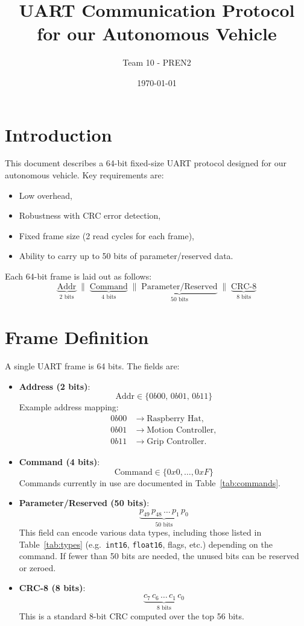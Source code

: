 \documentclass[a4paper,11pt]{article}
\begin{document}
\title{UART Communication Protocol for our Autonomous Vehicle}
\author{Team 10 - PREN2}
\date{\today}
\maketitle

\section{Introduction}
This document describes a 64-bit fixed-size UART protocol designed for our autonomous vehicle. Key requirements are:
\begin{itemize}
  \item Low overhead,
  \item Robustness with CRC error detection,
  \item Fixed frame size (2 read cycles for each frame),
  \item Ability to carry up to 50 bits of parameter/reserved data.
\end{itemize}

\bigskip
Each 64-bit frame is laid out as follows:
\[
\underbrace{\text{Addr}}_{2 \text{ bits}}
\;\|\;
\underbrace{\text{Command}}_{4 \text{ bits}}
\;\|\;
\underbrace{\text{Parameter/Reserved}}_{50 \text{ bits}}
\;\|\;
\underbrace{\text{CRC-8}}_{8 \text{ bits}}
\]

\section{Frame Definition}
A single UART frame is 64 bits. The fields are:

\begin{itemize}
  \item \textbf{Address (2 bits)}:
    \[
      \text{Addr} \in \{0b00,\, 0b01,\, 0b11\}
    \]
    Example address mapping:
    \begin{align*}
      0b00 &\rightarrow \text{Raspberry Hat},\\
      0b01 &\rightarrow \text{Motion Controller},\\
      0b11 &\rightarrow \text{Grip Controller}.
    \end{align*}

  \item \textbf{Command (4 bits)}:
    \[
      \text{Command} \in \{ 0x0,\dots,0xF \}
    \]
    Commands currently in use are documented in Table~\ref{tab:commands}.

  \item \textbf{Parameter/Reserved (50 bits)}:
    \[
      \underbrace{p_{49} \, p_{48} \, \dots \, p_{1} \, p_{0}}_{50 \text{ bits}}
    \]
    This field can encode various data types, including those listed in Table~\ref{tab:types} (e.g.\ \texttt{int16}, \texttt{float16}, flags, etc.) depending on the command. If fewer than 50 bits are needed, the unused bits can be reserved or zeroed.

  \item \textbf{CRC-8 (8 bits)}:
    \[
      \underbrace{c_{7}\,c_{6}\,\dots\,c_{1}\,c_{0}}_{8 \text{ bits}}
    \]
    This is a standard 8-bit CRC computed over the top 56 bits.
\end{itemize}
\end{document}
